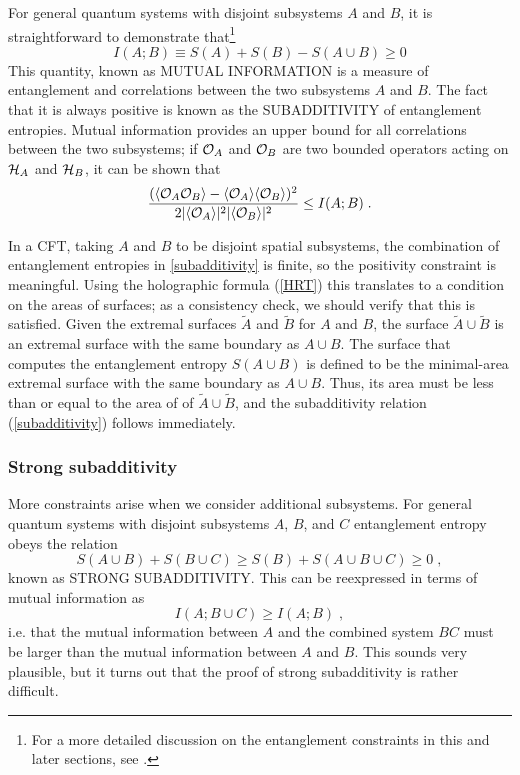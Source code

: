 \documentclass[12pt,epsf]{article}
\newcommand{\be}{\begin{equation}}
\newcommand{\ee}{\end{equation}}
\begin{document}
For general quantum systems with disjoint subsystems $A$ and $B$, it is straightforward to demonstrate that\footnote{For a more detailed discussion on the entanglement constraints in this and later sections, see \cite{nielsen2010quantum}.}
\be
\label{subadditivity}
I(A;B) \equiv S(A) + S(B) - S(A \cup B) \ge 0
\ee
This quantity, known as MUTUAL INFORMATION is a measure of entanglement and correlations between the two subsystems $A$ and $B$. The fact that it is always positive is known as the SUBADDITIVITY of entanglement entropies. Mutual information provides an upper bound for all correlations between the two subsystems; if ${\cal O}_A$ and ${\cal O}_B$ are two bounded operators acting on ${\cal H}_A$ and ${\cal H}_B$, it can be shown that \cite{Wolfetal}
\be
{(\langle {\cal O}_A {\cal O}_B \rangle - \langle {\cal O}_A \rangle \langle {\cal O}_B \rangle)^2 \over 2|\langle {\cal O}_A \rangle|^2 |\langle {\cal O}_B \rangle|^2} \le I(A;B) \; .
\ee

In a CFT, taking $A$ and $B$ to be disjoint spatial subsystems, the combination of entanglement entropies in \ref{subadditivity} is finite, so the positivity constraint is meaningful. Using the holographic  formula (\ref{HRT}) this translates to a condition on the areas of surfaces; as a consistency check, we should verify that this is satisfied. Given the extremal surfaces $\tilde{A}$ and $\tilde{B}$ for $A$ and $B$, the surface $\tilde{A} \cup \tilde{B}$ is an extremal surface with the same boundary as $A \cup B$. The surface that computes the entanglement entropy $S(A \cup B)$ is defined to be the minimal-area extremal surface with the same boundary as $A \cup B$. Thus, its area must be less than or equal to the area of of $\tilde{A} \cup \tilde{B}$, and the subadditivity relation (\ref{subadditivity}) follows immediately.

\subsubsection*{Strong subadditivity}

More constraints arise when we consider additional subsystems. For general quantum systems with disjoint subsystems $A$, $B$, and $C$ entanglement entropy obeys the relation
\be
\label{SSA}
S(A \cup B) + S(B \cup C) \ge S(B) + S(A \cup B \cup C) \ge 0 \; ,
\ee
known as STRONG SUBADDITIVITY. This can be reexpressed in terms of mutual information as
\be
I(A;B \cup C) \ge I(A;B) \; ,
\ee
i.e. that the mutual information between $A$ and the combined system $BC$ must be larger than the mutual information between $A$ and $B$. This sounds very plausible, but it turns out that the proof of strong subadditivity is rather difficult.
\end{document}
